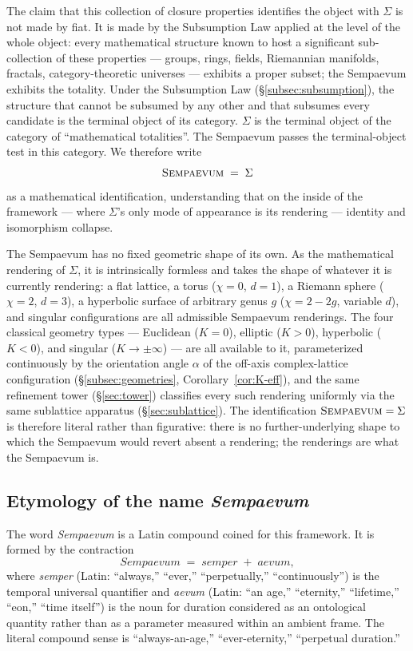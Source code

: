 \documentclass[11pt,a4paper]{article}
\theoremstyle{definition}
\theoremstyle{remark}
\newcommand{\Sempaevum}{\textnormal{\textsc{Sempaevum}}}
\begin{document}
The claim that this collection of closure properties identifies the object with $\Sigma$ is not made by fiat. It is made by the Subsumption Law applied at the level of the whole object: every mathematical structure known to host a significant sub-collection of these properties --- groups, rings, fields, Riemannian manifolds, fractals, category-theoretic universes --- exhibits a proper subset; the Sempaevum exhibits the totality. Under the Subsumption Law (\S\ref{subsec:subsumption}), the structure that cannot be subsumed by any other and that subsumes every candidate is the terminal object of its category. $\Sigma$ is the terminal object of the category of ``mathematical totalities''. The Sempaevum passes the terminal-object test in this category. We therefore write
\[
\Sempaevum \;=\; \Sigma
\]
as a mathematical identification, understanding that on the inside of the framework --- where $\Sigma$'s only mode of appearance is its rendering --- identity and isomorphism collapse.

The Sempaevum has no fixed geometric shape of its own. As the mathematical rendering of $\Sigma$, it is intrinsically formless and takes the shape of whatever it is currently rendering: a flat lattice, a torus ($\chi=0$, $d=1$), a Riemann sphere ($\chi=2$, $d=3$), a hyperbolic surface of arbitrary genus $g$ ($\chi=2-2g$, variable $d$), and singular configurations are all admissible Sempaevum renderings. The four classical geometry types --- Euclidean ($K=0$), elliptic ($K>0$), hyperbolic ($K<0$), and singular ($K\to\pm\infty$) --- are all available to it, parameterized continuously by the orientation angle $\alpha$ of the off-axis complex-lattice configuration (\S\ref{subsec:geometries}, Corollary~\ref{cor:K-eff}), and the same refinement tower (\S\ref{sec:tower}) classifies every such rendering uniformly via the same sublattice apparatus (\S\ref{sec:sublattice}). The identification $\Sempaevum = \Sigma$ is therefore literal rather than figurative: there is no further-underlying shape to which the Sempaevum would revert absent a rendering; the renderings are what the Sempaevum is.

\subsection{Etymology of the name \emph{Sempaevum}}\label{subsec:etymology}

The word \emph{Sempaevum} is a Latin compound coined for this framework. It is formed by the contraction
\[
\textit{Sempaevum} \;=\; \textit{semper} \;+\; \textit{aevum},
\]
where \emph{semper} (Latin: ``always,'' ``ever,'' ``perpetually,'' ``continuously'') is the temporal universal quantifier and \emph{aevum} (Latin: ``an age,'' ``eternity,'' ``lifetime,'' ``eon,'' ``time itself'') is the noun for duration considered as an ontological quantity rather than as a parameter measured within an ambient frame. The literal compound sense is ``always-an-age,'' ``ever-eternity,'' ``perpetual duration.''
\end{document}
